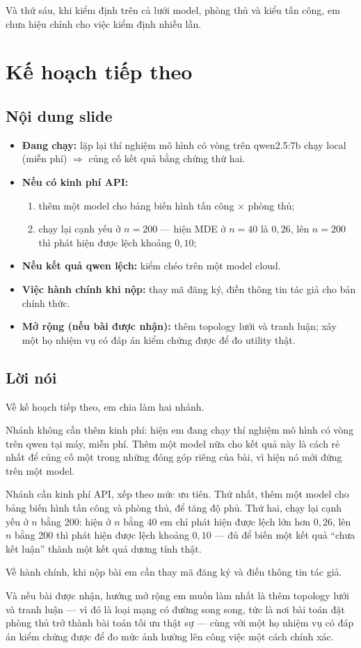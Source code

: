 \documentclass[11pt,a4paper]{article}
\newcommand{\slide}[1]{\section{#1}}
\newcommand{\noidung}{\subsection*{Nội dung slide}}
\newcommand{\loinoi}{\subsection*{Lời nói}}
\begin{document}
Và thứ sáu, khi kiểm định trên cả lưới model, phòng thủ và kiểu tấn công, em chưa hiệu
chỉnh cho việc kiểm định nhiều lần.

\slide{Kế hoạch tiếp theo}

\noidung
\begin{itemize}
  \item \textbf{Đang chạy:} lặp lại thí nghiệm mô hình có vòng trên qwen2.5:7b chạy
        local (miễn phí) $\Rightarrow$ củng cố kết quả bằng chứng thứ hai.
  \item \textbf{Nếu có kinh phí API:}
        \begin{enumerate}
          \item thêm một model cho bảng biến hình tấn công $\times$ phòng thủ;
          \item chạy lại cạnh yếu ở $n = 200$ --- hiện MDE ở $n = 40$ là $0{,}26$,
                lên $n = 200$ thì phát hiện được lệch khoảng $0{,}10$;
        \end{enumerate}
  \item \textbf{Nếu kết quả qwen lệch:} kiểm chéo trên một model cloud.
  \item \textbf{Việc hành chính khi nộp:} thay mã đăng ký, điền thông tin tác giả cho
        bản chính thức.
  \item \textbf{Mở rộng (nếu bài được nhận):} thêm topology lưới và tranh luận; xây một
        họ nhiệm vụ có đáp án kiểm chứng được để đo utility thật.
\end{itemize}

\loinoi
Về kế hoạch tiếp theo, em chia làm hai nhánh.

Nhánh không cần thêm kinh phí: hiện em đang chạy thí nghiệm mô hình có vòng trên qwen
tại máy, miễn phí. Thêm một model nữa cho kết quả này là cách rẻ nhất để củng cố một
trong những đóng góp riêng của bài, vì hiện nó mới đứng trên một model.

Nhánh cần kinh phí API, xếp theo mức ưu tiên. Thứ nhất, thêm một model cho bảng biến
hình tấn công và phòng thủ, để tăng độ phủ. Thứ hai, chạy lại cạnh yếu ở $n$ bằng 200:
hiện ở $n$ bằng 40 em chỉ phát hiện được lệch lớn hơn $0{,}26$, lên $n$ bằng 200 thì
phát hiện được lệch khoảng $0{,}10$ --- đủ để biến một kết quả ``chưa kết luận'' thành
một kết quả dương tính thật.

Về hành chính, khi nộp bài em cần thay mã đăng ký và điền thông tin tác giả.

Và nếu bài được nhận, hướng mở rộng em muốn làm nhất là thêm topology lưới và tranh
luận --- vì đó là loại mạng có đường song song, tức là nơi bài toán đặt phòng thủ trở
thành bài toán tối ưu thật sự --- cùng với một họ nhiệm vụ có đáp án kiểm chứng được
để đo mức ảnh hưởng lên công việc một cách chính xác.
\end{document}
